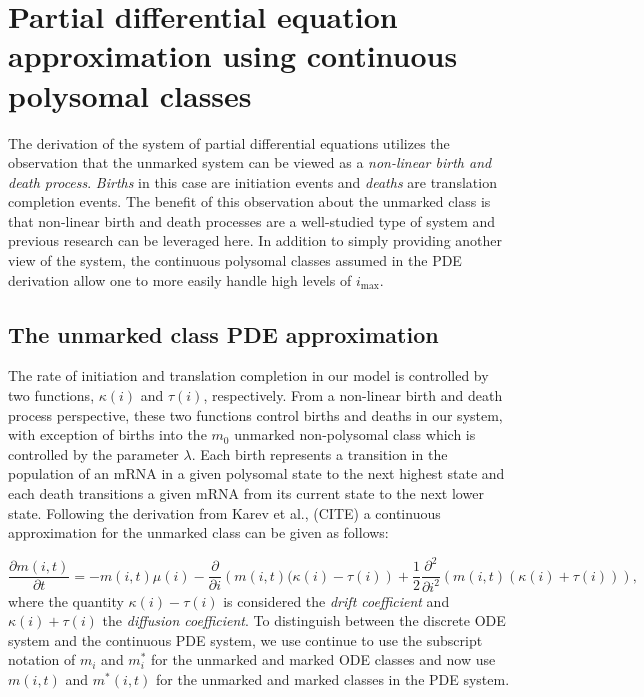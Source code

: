 \documentclass[review]{elsarticle}
\newcommand{\imax}{\ensuremath{i_{\max}}\xspace}
\newcommand\p[2]{\frac{\partial #1}{\partial #2}}
\newcommand\ptwo[2]{\frac{\partial^2 #1}{\partial #2^2}}
\begin{document}
\section{Partial differential equation approximation using continuous polysomal classes}
The derivation of the system of partial differential equations utilizes the observation that the unmarked system can be viewed as a \emph{non-linear birth and death process}. \emph{Births} in this case are initiation events and \emph{deaths} are translation completion events.
The benefit of this observation about the unmarked class is that non-linear birth and death processes are a well-studied type of system and previous research can be leveraged here.
In addition to simply providing another view of the system, the continuous polysomal classes assumed in the PDE derivation allow one to more easily handle high levels of \imax.

\subsection{The unmarked class PDE approximation}
The rate of initiation and translation completion in our model is controlled by two functions, $\kappa(i)$ and $\tau(i)$, respectively.
From a non-linear birth and death process perspective, these two functions control births and deaths in our system, with exception of births into the $m_0$ unmarked non-polysomal class which is controlled by the parameter $\lambda$.
Each birth represents a transition in the population of an mRNA in a given polysomal state to the next highest state and each death transitions a given mRNA from its current state to the next lower state.
Following the derivation from Karev et al., (CITE) a continuous approximation for the unmarked class can be given as follows:

\begin{equation}\label{eq:unmarked_pde}
\p{m(i,t)}{t}=-m(i,t)\mu(i)-\p{}{i}\left(m(i,t)(\kappa(i)-\tau(i)\right)+\frac{1}{2}\ptwo{}{i}\left(m(i,t)(\kappa(i)+\tau(i))\right),
\end{equation} where the quantity $\kappa(i)-\tau(i)$ is considered the \emph{drift coefficient} and $\kappa(i)+\tau(i)$ the \emph{diffusion coefficient}.
To distinguish between the discrete ODE system and the continuous PDE system, we use continue to use the subscript notation of $m_i$ and $m_i^*$ for the unmarked and marked ODE classes and now use $m(i,t)$ and $m^*(i,t)$ for the unmarked and marked classes in the PDE system.
\end{document}
